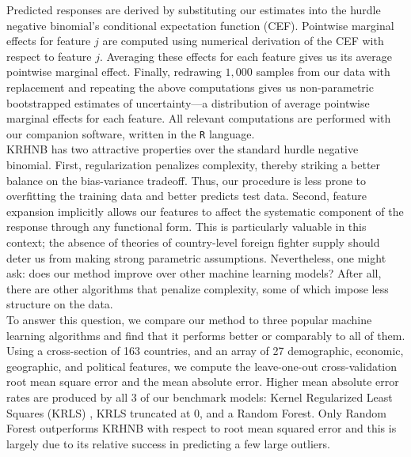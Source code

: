 \documentclass[12pt]{article}
\begin{document}
Predicted responses are derived by substituting our estimates into the hurdle negative binomial's conditional expectation function (CEF). Pointwise marginal effects for feature $j$ are computed using numerical derivation of the CEF with respect to feature $j$. Averaging these effects for each feature gives us its average pointwise marginal effect. Finally, redrawing $1,000$ samples from our data with replacement and repeating the above computations gives us non-parametric bootstrapped estimates of uncertainty---a distribution of average pointwise marginal effects for each feature. All relevant computations are performed with our companion software, written in the \texttt{R} language.	\\

KRHNB has two attractive properties over the standard hurdle negative binomial. First, regularization penalizes complexity, thereby striking a better balance on the bias-variance tradeoff. Thus, our procedure is less prone to overfitting the training data and better predicts test data. Second, feature expansion implicitly allows our features to affect the systematic component of the response through any functional form. This is particularly valuable in this context; the absence of theories of country-level foreign fighter supply should deter us from making strong parametric assumptions. Nevertheless, one might ask: does our method improve over other machine learning models? After all, there are other algorithms that penalize complexity, some of which impose less structure on the data.   \\

To answer this question, we compare our method to three popular machine learning algorithms and find that it performs better or comparably to all of them. Using a cross-section of 163 countries, and an array of 27 demographic, economic, geographic, and political features, we compute the leave-one-out cross-validation root mean square error and the mean absolute error. Higher mean absolute error rates are produced by all 3 of our benchmark models: Kernel Regularized Least Squares (KRLS) \citep{Hainmueller2013}, KRLS truncated at 0, and a Random Forest. Only Random Forest outperforms KRHNB with respect to root mean squared error and this is largely due to its relative success in predicting a few large outliers. \\
\end{document}
